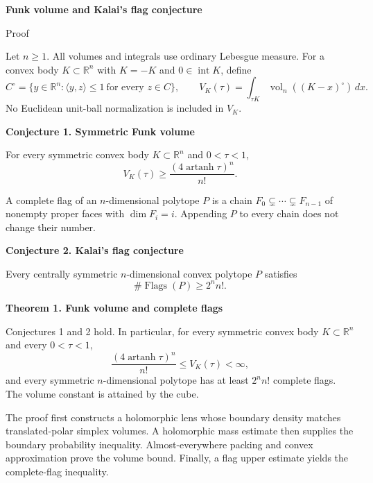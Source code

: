 \documentclass[11pt,a4paper]{article}
\newenvironment{statement}[1]{\begin{tcolorbox}[proofbox]\textbf{#1}\par\smallskip}{\end{tcolorbox}}
\newcommand{\R}{\mathbb R}
\newcommand{\vol}{\operatorname{vol}_n}
\newcommand{\intr}{\operatorname{int}}
\newcommand{\artanh}{\operatorname{artanh}}
\newcommand{\Flags}{\operatorname{Flags}}
\newcommand{\pair}[2]{\langle #1,#2\rangle}
\begin{document}
\thispagestyle{plain}
{\Large\bfseries Funk volume and Kalai's flag conjecture}\par
{\large Proof}\par\vspace{8pt}

Let $n\geq1$. All volumes and integrals use ordinary Lebesgue measure.
For a convex body $K\subset\R^n$ with $K=-K$ and $0\in\intr K$, define
\[
 C^\circ=\{y\in\R^n:\pair yz\leq1\ \text{for every }z\in C\},
 \qquad V_K(\tau)=\int_{\tau K}\vol((K-x)^\circ)\,dx.
\]
No Euclidean unit-ball normalization is included in $V_K$.

\begin{statement}{Conjecture 1. Symmetric Funk volume}
For every symmetric convex body $K\subset\R^n$ and $0<\tau<1$,
\[
 V_K(\tau)\geq\frac{(4\artanh\tau)^n}{n!}.
\]
\end{statement}

A complete flag of an $n$-dimensional polytope $P$ is a chain
$F_0\subsetneq\cdots\subsetneq F_{n-1}$ of nonempty proper faces with
$\dim F_i=i$. Appending $P$ to every chain does not change their number.

\begin{statement}{Conjecture 2. Kalai's flag conjecture}
Every centrally symmetric $n$-dimensional convex polytope $P$ satisfies
\[
 \#\Flags(P)\geq2^n n!.
\]
\end{statement}

\begin{statement}{Theorem 1. Funk volume and complete flags}
Conjectures 1 and 2 hold. In particular, for every symmetric convex body
$K\subset\R^n$ and every $0<\tau<1$,
\[
 \frac{(4\artanh\tau)^n}{n!}\leq V_K(\tau)<\infty,
\]
and every symmetric $n$-dimensional polytope has at least $2^n n!$
complete flags. The volume constant is attained by the cube.
\end{statement}

The proof first constructs a holomorphic lens whose boundary density
matches translated-polar simplex volumes. A holomorphic mass estimate
then supplies the boundary probability inequality. Almost-everywhere
packing and convex approximation prove the volume bound. Finally, a
flag upper estimate yields the complete-flag inequality.
\end{document}
